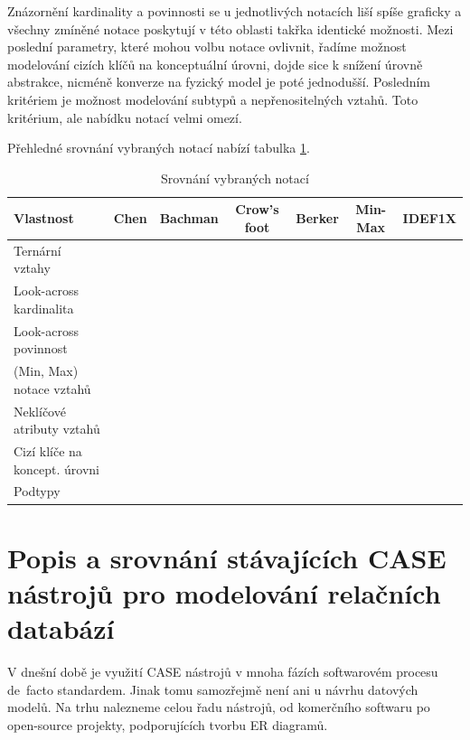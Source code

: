 \documentclass[czech,bachelor,public,dept460,male,oneside]{diploma}
\newcommand{\xmark}{\ding{55}}
\newcommand{\cmark}{\ding{51}}
\begin{document}
	Znázornění kardinality a povinnosti se u jednotlivých notacích liší spíše graficky a všechny zmíněné notace poskytují v této oblasti takřka identické možnosti. Mezi poslední parametry, které mohou volbu notace ovlivnit, řadíme možnost modelování cizích klíčů na konceptuální úrovni, dojde sice k snížení úrovně abstrakce, nicméně konverze na fyzický model je poté jednodušší. Posledním kritériem je možnost modelování subtypů a nepřenositelných vztahů. Toto kritérium, ale nabídku notací velmi omezí. 
	
	Přehledné srovnání vybraných notací nabízí tabulka \ref{tab:notationCmp}.
	
	\begin{table}[!h]
		\centering
		\caption{Srovnání vybraných notací}
		\label{tab:notationCmp}
		
		\begin{tabular}{l c c c c c c}
			\toprule
			Vlastnost & Chen & Bachman & Crow's foot & Berker & Min-Max & IDEF1X \\
			\midrule
			Ternární vztahy & \cmark & \xmark & \xmark & \xmark & \xmark & \xmark \\
			Look-across kardinalita & \cmark & \cmark & \cmark & \cmark & \xmark & \cmark \\
			Look-across povinnost & \xmark & \xmark & \cmark & \xmark & \xmark & \cmark \\
			(Min, Max) notace vztahů & \xmark & \xmark & \cmark & \xmark & \cmark & \cmark \\
			Neklíčové atributy vztahů & \cmark & \xmark & \xmark & \xmark & \xmark & \xmark \\
			Cizí klíče na koncept. úrovni & \xmark & \cmark & \xmark & \xmark & \xmark & \cmark \\
			Podtypy & \cmark & \cmark & \cmark & \cmark & \cmark & \xmark \\
			\midrule
		\end{tabular}
	\end{table}

\newpage
\section{Popis a srovnání stávajících CASE nástrojů pro modelování relačních databází}
V dnešní době je využití CASE nástrojů v mnoha fázích softwarovém procesu de~facto standardem. Jinak tomu samozřejmě není ani u návrhu datových modelů. Na trhu nalezneme celou řadu nástrojů, od komerčního softwaru po open-source projekty, podporujících tvorbu ER diagramů. 
\end{document}
